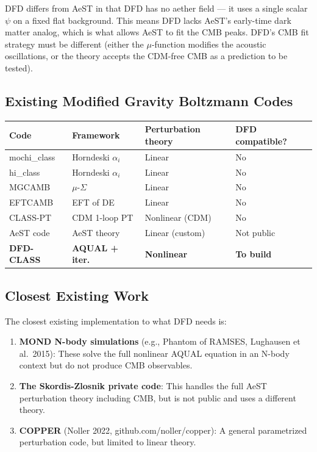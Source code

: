 \documentclass[11pt]{article}
\theoremstyle{definition}
\theoremstyle{remark}
\begin{document}
DFD differs from AeST in that DFD has no aether field --- it uses a
single scalar $\psi$ on a fixed flat background. This means DFD lacks
AeST's early-time dark matter analog, which is what allows AeST to
fit the CMB peaks. DFD's CMB fit strategy must be different (either
the $\mu$-function modifies the acoustic oscillations, or the theory
accepts the CDM-free CMB as a prediction to be tested).

\subsection{Existing Modified Gravity Boltzmann Codes}

\begin{center}
\begin{tabular}{llll}
\toprule
Code & Framework & Perturbation theory & DFD compatible? \\
\midrule
mochi\_class & Horndeski $\alpha_i$ & Linear & No \\
hi\_class & Horndeski $\alpha_i$ & Linear & No \\
MGCAMB & $\mu$-$\Sigma$ & Linear & No \\
EFTCAMB & EFT of DE & Linear & No \\
CLASS-PT & CDM 1-loop PT & Nonlinear (CDM) & No \\
AeST code & AeST theory & Linear (custom) & Not public \\
\textbf{DFD-CLASS} & \textbf{AQUAL + iter.} & \textbf{Nonlinear} & \textbf{To build} \\
\bottomrule
\end{tabular}
\end{center}

\subsection{Closest Existing Work}

The closest existing implementation to what DFD needs is:
\begin{enumerate}
\item \textbf{MOND N-body simulations} (e.g., Phantom of RAMSES,
  Lughausen et al.\ 2015): These solve the full nonlinear AQUAL
  equation in an N-body context but do not produce CMB observables.
\item \textbf{The Skordis-Zlosnik private code}: This handles the
  full AeST perturbation theory including CMB, but is not public
  and uses a different theory.
\item \textbf{COPPER} (Noller 2022, github.com/noller/copper):
  A general parametrized perturbation code, but limited to linear theory.
\end{enumerate}
\end{document}
